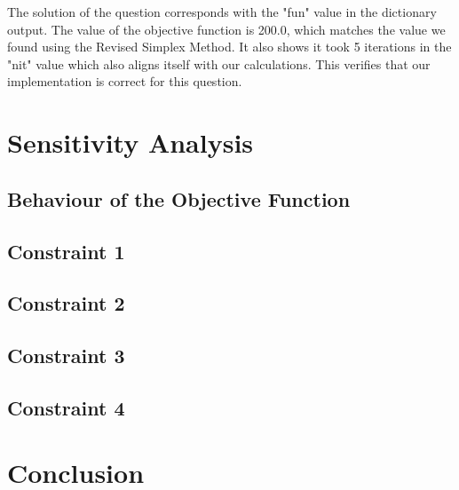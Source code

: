 \documentclass{article}
\numberwithin{equation}{section}
\begin{document}
The solution of the question corresponds with the "fun" value in the dictionary output. The value of the objective function is 200.0, which matches the value we found using the Revised Simplex Method. It also shows it took 5 iterations in the "nit" value which also aligns itself with our calculations. This verifies that our implementation is correct for this question.

\newpage
\section{Sensitivity Analysis}
\subsection{Behaviour of the Objective Function}
\subsection{Constraint 1}
\subsection{Constraint 2}
\subsection{Constraint 3}
\subsection{Constraint 4}
\newpage
\section{Conclusion}
\end{document}
